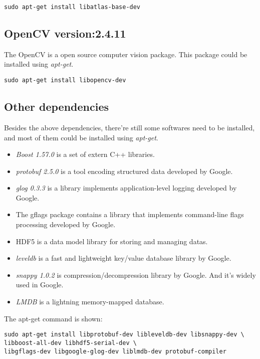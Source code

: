 \documentclass[a4paper, 11pt]{article}
\begin{document}
\begin{lstlisting}
sudo apt-get install libatlas-base-dev
\end{lstlisting}

\subsection{OpenCV version:2.4.11}

The OpenCV is a open source computer vision package. This package could be installed using \emph{apt-get}.

\begin{lstlisting}
sudo apt-get install libopencv-dev
\end{lstlisting}

\subsection{Other dependencies}

Besides the above dependencies, there're still some softwares need to be installed, and most of them could be installed using \emph{apt-get}.

\begin{itemize}
\item \emph{Boost 1.57.0} \cite{boost1} is a set of extern C++ libraries.
\item \emph{protobuf 2.5.0} \cite{protobuf} is a tool encoding structured data developed by Google.
\item \emph{glog 0.3.3} \cite{glog} is a library implements application-level logging developed by Google.
\item The gflags package contains a library that implements command-line flags processing developed by Google.
\item HDF5 is a data model library for storing and managing datas.
\item \emph{leveldb} is a fast and lightweight key/value database library by Google.
\item \emph{snappy 1.0.2} is compression/decompression library by Google. And it's widely used in Google.
\item \emph{LMDB} is a lightning memory-mapped database.
\end{itemize}
The apt-get command is shown:
\begin{lstlisting}
sudo apt-get install libprotobuf-dev libleveldb-dev libsnappy-dev \
libboost-all-dev libhdf5-serial-dev \	
libgflags-dev libgoogle-glog-dev liblmdb-dev protobuf-compiler
\end{lstlisting}
\end{document}
